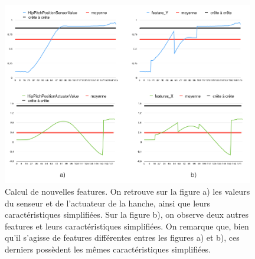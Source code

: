 \begin{figure}[h]
	\centering\includegraphics[height=8cm]{images/caracteristiques_simples_2.png}
	\caption[Comparaison de deux caractéristiques]{Calcul de nouvelles features. On retrouve sur la figure a) les valeurs du senseur et de l'actuateur de la hanche, ainsi que leurs caractéristiques simplifiées. Sur la figure b), on observe deux autres features et leurs caractéristiques simplifiées. On remarque que, bien qu'il s'agisse de features différentes entres les figures a) et b), ces derniers possèdent les mêmes caractéristiques simplifiées.}
	\label{fig:Comparaison de deux caractéristiques}
\end{figure}

